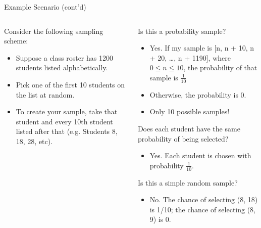 \documentclass[aspectratio=169]{../latex_main/tntbeamer}  %
\begin{document}
		\begin{frame}{Example Scenario (cont'd)}
	    \begin{columns}
	        \begin{column}{.3\textwidth}
	            Consider the following sampling scheme:

	            \begin{itemize}
	                \item Suppose a class roster has 1200 students listed alphabetically.
	                \item Pick one of the first 10 students on the list at random.
	                \item To create your sample, take that student and every 10th student listed after that (e.g. Students 8, 18, 28, etc).
	            \end{itemize}
                 
	        \end{column}
	        
	        \begin{column}{.6\textwidth}
	           Is this a probability sample?
	           \begin{itemize}
	               \item Yes. If my sample is [n, n + 10, n + 20, …, n + 1190], where $0 \leq n \leq 10$, the probability of that sample is $\frac{1}{10}$
	               \item Otherwise, the probability is 0.
	               \item Only 10 possible samples!
	           \end{itemize}
            \pause
	           Does each student have the same probability of being selected?
	           \begin{itemize}
	               \item Yes. Each student is chosen with probability $\frac{1}{10}$. 
	           \end{itemize}
                \pause
	           Is this a simple random sample?
                \begin{itemize}
                    \item No. The chance of selecting (8, 18) is 1/10; the chance of selecting (8, 9) is 0.
                \end{itemize}

	        \end{column}
	        
	    \end{columns}
	    
	\end{frame}
	
\end{document}
